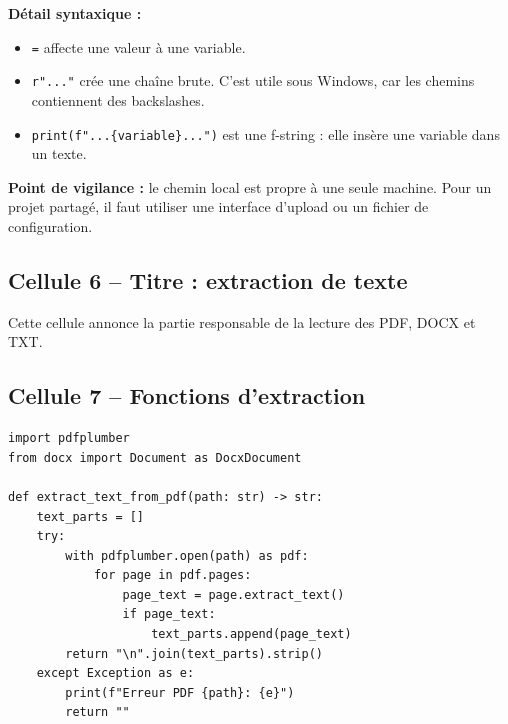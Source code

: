 \documentclass[12pt,a4paper]{article}
\begin{document}
\textbf{Détail syntaxique :}
\begin{itemize}
  \item \texttt{=} affecte une valeur à une variable.
  \item \texttt{r"..."} crée une chaîne brute. C'est utile sous Windows, car les chemins contiennent des backslashes.
  \item \texttt{print(f"...\{variable\}...")} est une f-string : elle insère une variable dans un texte.
\end{itemize}

\textbf{Point de vigilance :} le chemin local est propre à une seule machine. Pour un projet partagé, il faut utiliser une interface d'upload ou un fichier de configuration.

\subsection{Cellule 6 -- Titre : extraction de texte}

Cette cellule annonce la partie responsable de la lecture des PDF, DOCX et TXT.

\subsection{Cellule 7 -- Fonctions d'extraction}

\begin{lstlisting}[style=pythonstyle]
import pdfplumber
from docx import Document as DocxDocument

def extract_text_from_pdf(path: str) -> str:
    text_parts = []
    try:
        with pdfplumber.open(path) as pdf:
            for page in pdf.pages:
                page_text = page.extract_text()
                if page_text:
                    text_parts.append(page_text)
        return "\n".join(text_parts).strip()
    except Exception as e:
        print(f"Erreur PDF {path}: {e}")
        return ""
\end{lstlisting}
\end{document}
